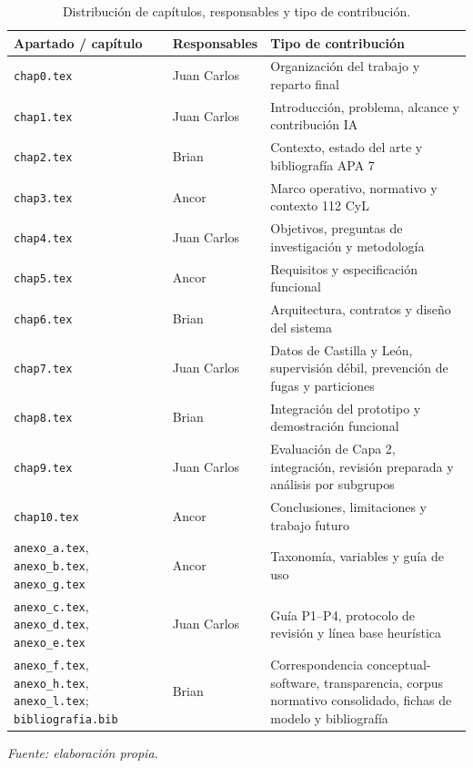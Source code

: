 \begin{table}[htbp]
\centering
\scriptsize
\setlength{\tabcolsep}{4pt}
\begin{tabular}{|p{4.2cm}|p{4.2cm}|p{4.6cm}|}
\hline
\textbf{Apartado / capítulo} & \textbf{Responsables} & \textbf{Tipo de contribución} \\ \hline
\texttt{chap0.tex} & Juan Carlos & Organización del trabajo y reparto final \\ \hline
\texttt{chap1.tex} & Juan Carlos & Introducción, problema, alcance y contribución IA \\ \hline
\texttt{chap2.tex} & Brian & Contexto, estado del arte y bibliografía APA 7 \\ \hline
\texttt{chap3.tex} & Ancor & Marco operativo, normativo y contexto 112 CyL \\ \hline
\texttt{chap4.tex} & Juan Carlos & Objetivos, preguntas de investigación y metodología \\ \hline
\texttt{chap5.tex} & Ancor & Requisitos y especificación funcional \\ \hline
\texttt{chap6.tex} & Brian & Arquitectura, contratos y diseño del sistema \\ \hline
\texttt{chap7.tex} & Juan Carlos & Datos de Castilla y León, supervisión débil, prevención de fugas y particiones \\ \hline
\texttt{chap8.tex} & Brian & Integración del prototipo y demostración funcional \\ \hline
\texttt{chap9.tex} & Juan Carlos & Evaluación de Capa 2, integración, revisión preparada y análisis por subgrupos \\ \hline
\texttt{chap10.tex} & Ancor & Conclusiones, limitaciones y trabajo futuro \\ \hline
\texttt{anexo\_a.tex}, \texttt{anexo\_b.tex}, \texttt{anexo\_g.tex} & Ancor & Taxonomía, variables y guía de uso \\ \hline
\texttt{anexo\_c.tex}, \texttt{anexo\_d.tex}, \texttt{anexo\_e.tex} & Juan Carlos & Guía P1--P4, protocolo de revisión y línea base heurística \\ \hline
\texttt{anexo\_f.tex}, \texttt{anexo\_h.tex}, \texttt{anexo\_l.tex}; \texttt{bibliografia.bib} & Brian & Correspondencia conceptual-software, transparencia, corpus normativo consolidado, fichas de modelo y bibliografía \\ \hline
\end{tabular}
\caption{Distribución de capítulos, responsables y tipo de contribución.}
\label{tab:tab1secCTF}
\smallskip
{\small\textit{Fuente: elaboración propia.}\par}
\end{table}

